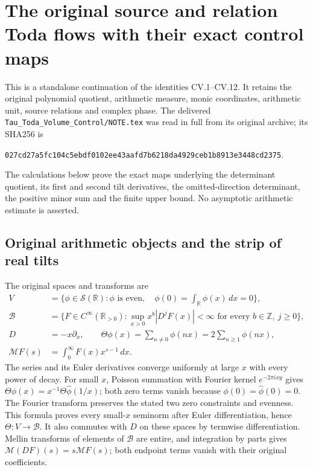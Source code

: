 \begingroup
\def\C{\mathbb{C}}
\def\R{\mathbb{R}}
\def\tr{\operatorname{Tr}}
\def\Span{\operatorname{span}}
\def\im{\operatorname{im}}
\def\Alt{\operatorname{Alt}}
\section{The original source and relation Toda flows with their exact control maps}



This is a standalone continuation of the identities CV.1--CV.12. It
retains the original polynomial quotient, arithmetic measure, monic
coordinates, arithmetic unit, source relations and complex phase. The
delivered \texttt{Tau\_Toda\_Volume\_Control/NOTE.tex} was read in full
from its original archive; its SHA256 is
\begin{center}\footnotesize
\nolinkurl{027cd27a5fc104c5ebdf0102ee43aafd7b6218da4929ceb1b8913e3448cd2375}.
\end{center}
The calculations below prove the exact maps underlying the determinant
quotient, its first and second tilt derivatives, the omitted-direction
determinant, the positive minor sum and the finite upper bound. No
asymptotic arithmetic estimate is asserted.

\subsection{Original arithmetic objects and the strip of real tilts}

The original spaces and transforms are
\[
 \begin{split}
 V&=\{\phi\in\mathcal S(\R):\phi\text{ is even},\quad
                     \phi(0)=\int_{\R}\phi(x)\,dx=0\},\\
 \mathscr B&=\{F\in C^\infty(\R_{>0}):
       \sup_{x>0}x^b|D^jF(x)|<\infty
           \text{ for every }b\in\mathbb Z,\ j\ge0\},\\
 D&=-x\partial_x,\qquad
 \Theta\phi(x)=\sum_{n\ne0}\phi(nx)=2\sum_{n\ge1}\phi(nx),\\
 \mathcal MF(s)&=\int_0^\infty F(x)x^{s-1}\,dx.
 \end{split}
\]
The series and its Euler derivatives converge uniformly at large
$x$ with every power of decay. For small $x$, Poisson summation
with Fourier kernel $e^{-2\pi ixy}$ gives
$\Theta\phi(x)=x^{-1}\Theta\widehat\phi(1/x)$; both zero terms
vanish because $\phi(0)=\widehat\phi(0)=0$.
The Fourier transform preserves the stated two zero constraints
and evenness. This formula proves every small-$x$ seminorm after
Euler differentiation, hence $\Theta:V\to\mathscr B$.
It also commutes with $D$ on these spaces by termwise differentiation.
Mellin transforms of elements of $\mathscr B$ are entire, and
integration by parts gives $\mathcal M(DF)(s)=s\mathcal MF(s)$;
both endpoint terms vanish with their original coefficients.

